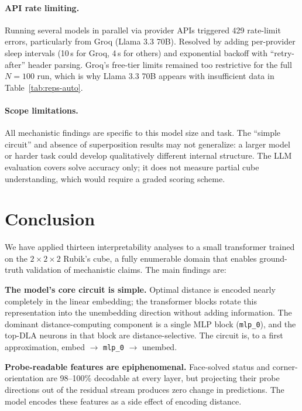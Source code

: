 \documentclass[12pt]{article}
\begin{document}
\paragraph{API rate limiting.}
Running several models in parallel via provider APIs triggered 429 rate-limit
errors, particularly from Groq (Llama 3.3 70B).  Resolved by adding
per-provider sleep intervals (10\,s for Groq, 4\,s for others) and exponential
backoff with ``retry-after'' header parsing.  Groq's free-tier limits remained
too restrictive for the full $N{=}100$ run, which is why Llama 3.3 70B appears
with insufficient data in Table~\ref{tab:reps-auto}.

\paragraph{Scope limitations.}
All mechanistic findings are specific to this model size and task.  The
``simple circuit'' and absence of superposition results may not generalize:
a larger model or harder task could develop qualitatively different internal
structure.  The LLM evaluation covers solve accuracy only; it does not measure
partial cube understanding, which would require a graded scoring scheme.

\section{Conclusion}

We have applied thirteen interpretability analyses to a small transformer trained
on the $2{\times}2{\times}2$ Rubik's cube, a fully enumerable domain that enables
ground-truth validation of mechanistic claims.  The main findings are:

\textbf{The model's core circuit is simple.}  Optimal distance is encoded nearly
completely in the linear embedding; the transformer blocks rotate this representation
into the unembedding direction without adding information.  The dominant
distance-computing component is a single MLP block (\texttt{mlp\_0}), and the
top-DLA neurons in that block are distance-selective.  The circuit is, to a first
approximation, embed $\to$ \texttt{mlp\_0} $\to$ unembed.

\textbf{Probe-readable features are epiphenomenal.}  Face-solved status and
corner-orientation are 98--100\% decodable at every layer, but projecting their
probe directions out of the residual stream produces zero change in predictions.
The model encodes these features as a side effect of encoding distance.
\end{document}

